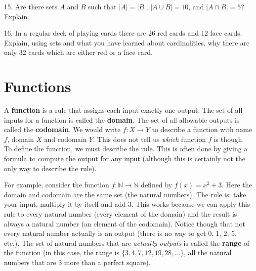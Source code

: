 \documentclass[10pt,]{memoir}
\newcommand{\terminology}[1]{\textbf{#1}}
\theoremstyle{plain}
\theoremstyle{definition}
\theoremstyle{definition}
\theoremstyle{definition}
\numberwithin{equation}{chapter}
\def\N{\mathbb N}
\begin{document}
\begin{exerciselist}
\par\smallskip
\item[15.]\hypertarget{exercise-25}{}
          Are there sets \(A\) and \(B\) such that \(|A| = |B|\), \(|A\cup B| = 10\), and \(|A\cap B| = 5\)? Explain.
\par\smallskip
\item[16.]\hypertarget{exercise-26}{}
          In a regular deck of playing cards there are 26 red cards and 12 face cards. Explain, using sets and what you have learned about cardinalities, why there are only 32 cards which are either red or a face card.
\par\smallskip
\end{exerciselist}
\typeout{************************************************}
\typeout{************************************************}
\section[Functions]{Functions}\label{sec_intro-functions}
\typeout{************************************************}
\typeout{************************************************}

      A
      \terminology{function} is a rule that assigns each input exactly one output. The set of all inputs for a function is called the
      \terminology{domain}. The set of all allowable outputs is called the
      \terminology{codomain}. We would write \(f:X \to Y\) to describe a function with name \(f\), domain \(X\) and codomain \(Y\). This does not tell us \emph{which} function \(f\) is though. To define the function, we must describe the rule. This is often done by giving a formula to compute the output for any input (although this is certainly not the only way to describe the rule). %
\par
 For example, consider the function \(f:\N \to \N\) defined by \(f(x) = x^2 + 3\). Here the domain and codomain are the same set (the natural numbers). The rule is: take your input, multiply it by itself and add 3. This works because we can apply this rule to every natural number (every element of the domain) and the result is always a natural number (an element of the codomain). Notice though that not every natural number actually is an output (there is no way to get 0, 1, 2, 5, etc.). The set of natural numbers that are \emph{actually outputs} is called the
      \terminology{range} of the function (in this case, the range is \(\{3, 4, 7, 12, 19, 28, \ldots\}\), all the natural numbers that are 3 more than a perfect square).
\par
\end{document}

